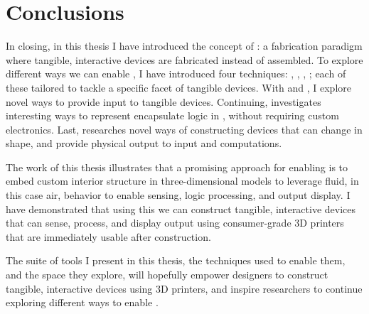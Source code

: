 \chapter{Conclusions} \label{ch:conclusion}
  In closing, in this thesis I have introduced the concept of \papf: a
  fabrication paradigm where tangible, interactive devices are fabricated
  instead of assembled. To explore different ways we can enable \papf, I have
  introduced four techniques: \at, \bh, \al, \mp; each of these tailored to
  tackle a specific facet of tangible devices. With \at and \bh, I explore novel
  ways to provide input to tangible devices. Continuing, \al investigates
  interesting ways to represent encapsulate logic in ,
  without requiring custom electronics.  Last, \mp researches novel ways of
  constructing devices that can change in shape, and provide physical output to
  input and computations.

  The work of this thesis illustrates that a promising approach for enabling
  \papf is to embed custom interior structure in three-dimensional models
  to leverage fluid, in this case air, behavior to enable sensing, logic
  processing, and output display. I have demonstrated that using this
   we can construct tangible, interactive devices that can sense,
  process, and display output using consumer-grade 3D printers that are
  immediately usable after construction.

  The suite of tools I present in this thesis, the techniques used to enable
  them, and the space they explore, will hopefully empower designers to
  construct tangible, interactive devices using 3D printers, and inspire
  researchers to continue exploring different ways to enable \papf.